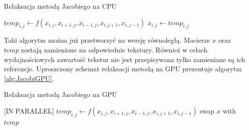 \begin{algorithm}[!h]
  \caption{Relaksacja metodą Jacobiego na CPU}
  \label{alg:JacobiCPU}
\begin{algorithmic}
    \State $temp_{i,j}\gets f(x_{i,j}, x_{i+1,j}, x_{i-1,j}, x_{i,j+1}, x_{i,j-1})$
  \EndFor
    \State $x_{i,j}\gets temp_{i,j}$
  \EndFor
\EndFor
\end{algorithmic}
\end{algorithm}

Taki algorytm można już przetworzyć na wersję równoległą. Macierze $x$ oraz
$temp$  zostają zamienione na odpowiednie tekstury. Również w celach
wydajnościowych zawartość tekstur nie jest przepisywana tylko zamieniane są
ich referencje. Uproszczony schemat relaksacji metodą  na GPU
prezentuje algorytm \ref{alg:JacobiGPU}.

\begin{algorithm}[!h]
  \caption{Relaksacja metodą Jacobiego na GPU}
  \label{alg:JacobiGPU}
\begin{algorithmic}
   [IN PARALLEL]
    \State $temp_{i,j}\gets f(x_{i,j}, x_{i+1,j}, x_{i-1,j}, x_{i,j+1}, x_{i,j-1})$
  \EndFor
  \State swap $x$ with $temp$
\EndFor
\end{algorithmic}
\end{algorithm}

